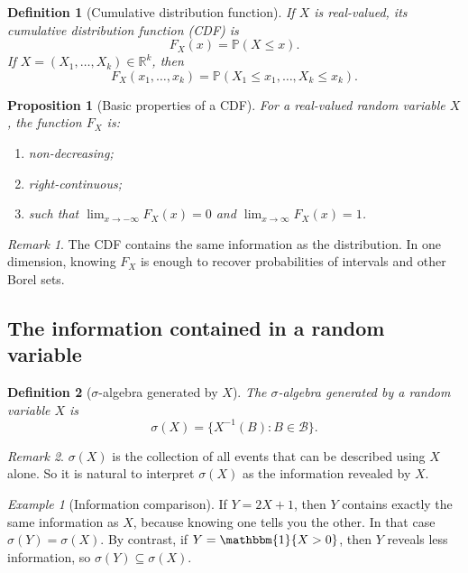\documentclass[11pt]{article}
\newtheorem{definition}{Definition}[section]
\newtheorem{proposition}{Proposition}[section]
\theoremstyle{remark}
\newtheorem{remark}{Remark}[section]
\newtheorem{example}{Example}[section]
\newcommand{\R}{\mathbb{R}}
\newcommand{\PP}{\mathbb{P}}
\newcommand{\1}{\mathbbm{1}}
\newcommand{\cB}{\mathcal{B}}
\begin{document}
\begin{definition}[Cumulative distribution function]
If \(X\) is real-valued, its cumulative distribution function (CDF) is
\[
  F_X(x)=\PP(X\le x).
\]
If \(X=(X_1,\dots,X_k)\in \R^k\), then
\[
  F_X(x_1,\dots,x_k)=\PP(X_1\le x_1,\dots,X_k\le x_k).
\]
\end{definition}

\begin{proposition}[Basic properties of a CDF]
For a real-valued random variable \(X\), the function \(F_X\) is:
\begin{enumerate}[label=(\roman*)]
  \item non-decreasing;
  \item right-continuous;
  \item such that \(\lim_{x\to -\infty}F_X(x)=0\) and \(\lim_{x\to \infty}F_X(x)=1\).
\end{enumerate}
\end{proposition}

\begin{remark}
The CDF contains the same information as the distribution. In one dimension, knowing \(F_X\) is enough to recover probabilities of intervals and other Borel sets.
\end{remark}

\subsection{The information contained in a random variable}

\begin{definition}[\(\sigma\)-algebra generated by \(X\)]
The \(\sigma\)-algebra generated by a random variable \(X\) is
\[
  \sigma(X)=\{X^{-1}(B): B \in \cB\}.
\]
\end{definition}

\begin{remark}
\(\sigma(X)\) is the collection of all events that can be described using \(X\) alone. So it is natural to interpret \(\sigma(X)\) as the information revealed by \(X\).
\end{remark}

\begin{example}[Information comparison]
If \(Y=2X+1\), then \(Y\) contains exactly the same information as \(X\), because knowing one tells you the other. In that case \(\sigma(Y)=\sigma(X)\). By contrast, if \(Y=\1\{X>0\}\), then \(Y\) reveals less information, so \(\sigma(Y)\subseteq \sigma(X)\).
\end{example}
\end{document}
